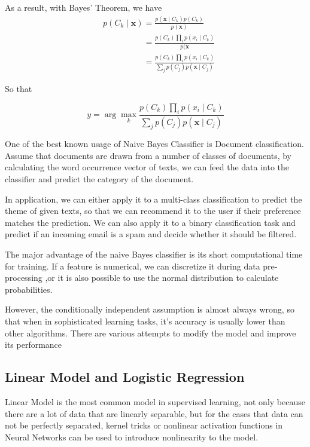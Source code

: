 \documentclass[10pt,twocolumn,letterpaper]{article}
\begin{document}
	As a result, with Bayes' Theorem, we have
		\begin{align}
			&p(C_k \mid \mathbf{x}) = \frac{p(\mathbf{x} \mid C_k)p(C_k)}{p(\mathbf{x})}\nonumber\\
			&\phantom{p(C_k \mid \mathbf{x})} = \frac{p(C_k)\prod_{i} p(x_i \mid C_k)}{p(\mathbf{x}}\nonumber\\
			&\phantom{p(C_k \mid \mathbf{x})} = \frac{p(C_k)\prod_{i} p(x_i \mid C_k)}{\sum_j p(C_j)p(\mathbf{x} \mid C_j)}\nonumber
		\end{align}
		
	So that
	
	\[y = \arg\max_k \frac{p(C_k)\prod_{i} p(x_i \mid C_k)}{\sum_j p(C_j)p(\mathbf{x} \mid C_j)}\]
	
	One of the best known usage of Naive Bayes Classifier is Document classification. Assume that documents are drawn from a number of classes of documents, by calculating the word occurrence vector of texts, we can feed the data into the classifier and predict the category of the document. 
	
	In application, we can either apply it to a multi-class classification to predict the theme of given texts, so that we can recommend it to the user if their preference matches the prediction. We can also apply it to a binary classification task and predict if an incoming email is a spam and decide whether it should be filtered.
	
	The major advantage of the naive Bayes classifier is its short computational time for training\cite{kotsiantis2007supervised}. If a feature is numerical, we can discretize it during data pre-processing \cite{2003yang&webb} ,or it is also possible to use the normal distribution to calculate probabilities\cite{Bouckaert2004}.
	
	However, the conditionally independent assumption is almost always wrong, so that when in sophisticated learning tasks, it's accuracy is usually lower than other algorithms. There are various attempts to modify the model and improve its performance
\subsection{Linear Model and Logistic Regression}	
	Linear Model is the most common model in supervised learning\cite{murphy_2013}, not only because there are a lot of data that are linearly separable, but for the cases that data can not be perfectly separated, kernel tricks or nonlinear activation functions in Neural Networks can be used to introduce nonlinearity to the model.
	
\end{document}
